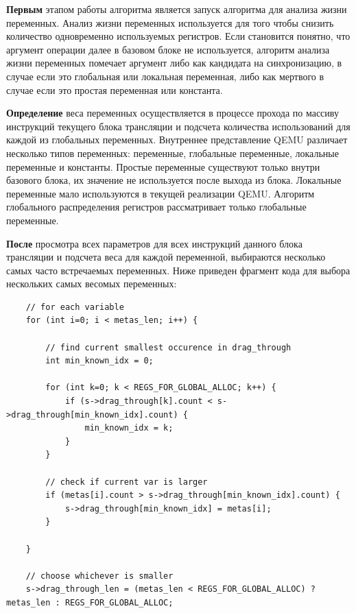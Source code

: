 \textbf{Первым}
этапом работы алгоритма является запуск алгоритма для анализа жизни переменных. Анализ жизни переменных
используется для того чтобы снизить количество одновременно используемых регистров. Если становится понятно, что аргумент операции далее в базовом блоке не используется, алгоритм анализа жизни переменных помечает аргумент либо как кандидата на синхронизацию, в случае если это глобальная или локальная переменная, либо как мертвого в случае если это простая переменная или константа.

\textbf{Определение}
веса переменных осуществляется в процессе прохода по массиву инструкций текущего блока трансляции и подсчета количества использований для каждой из глобальных переменных. Внутреннее представление QEMU различает несколько типов переменных: переменные, глобальные переменные, локальные переменные и константы. Простые переменные существуют только внутри базового блока, их значение не используется после выхода из блока. Локальные переменные мало используются в текущей реализации QEMU. Алгоритм глобального распределения регистров рассматривает только глобальные переменные.

\textbf{После}
просмотра всех параметров для всех инструкций данного блока трансляции и подсчета веса для каждой переменной, выбираются несколько самых часто встречаемых переменных. Ниже приведен фрагмент кода для выбора нескольких самых весомых переменных:

\begin{small}
\begin{verbatim}
    // for each variable
    for (int i=0; i < metas_len; i++) {

        // find current smallest occurence in drag_through
        int min_known_idx = 0;

        for (int k=0; k < REGS_FOR_GLOBAL_ALLOC; k++) {
            if (s->drag_through[k].count < s->drag_through[min_known_idx].count) {
                min_known_idx = k;
            }
        }
        
        // check if current var is larger
        if (metas[i].count > s->drag_through[min_known_idx].count) {
            s->drag_through[min_known_idx] = metas[i];
        }
        
    }

    // choose whichever is smaller
    s->drag_through_len = (metas_len < REGS_FOR_GLOBAL_ALLOC) ? metas_len : REGS_FOR_GLOBAL_ALLOC;
\end{verbatim}
\end{small}


